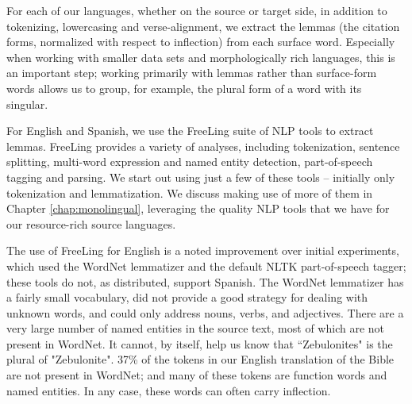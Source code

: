 For each of our languages, whether on the source or target side, in addition to
tokenizing, lowercasing and verse-alignment, we extract the lemmas (the
citation forms, normalized with respect to inflection) from each surface word.
Especially when working with smaller data sets and morphologically rich
languages, this is an important step; working primarily with lemmas rather than
surface-form words allows us to group, for example, the plural form of a word
with its singular.

For English and Spanish, we use the FreeLing suite of NLP tools
\cite{padro12} to extract lemmas. FreeLing provides a variety of analyses,
including tokenization, sentence splitting, multi-word expression and named
entity detection, part-of-speech tagging and parsing.  We start out using just
a few of these tools -- initially only tokenization and lemmatization. We
discuss making use of more of them in Chapter \ref{chap:monolingual},
leveraging the quality NLP tools that we have for our resource-rich source
languages.

The use of FreeLing for English is a noted improvement over initial
experiments, which used the WordNet lemmatizer and the default NLTK
part-of-speech tagger; these tools do not, as distributed, support Spanish.
The WordNet lemmatizer has a fairly small vocabulary, did not
provide a good strategy for dealing with unknown words, and could only address
nouns, verbs, and adjectives.
There are a very large number of named entities in the source text, most of
which are not present in WordNet. It cannot, by itself, help us know that
``Zebulonites" is the plural of "Zebulonite".  37\% of the tokens in our
English translation of the Bible are not present in WordNet; and many of these
tokens are function words and named entities. In any case, these words can
often carry inflection.

